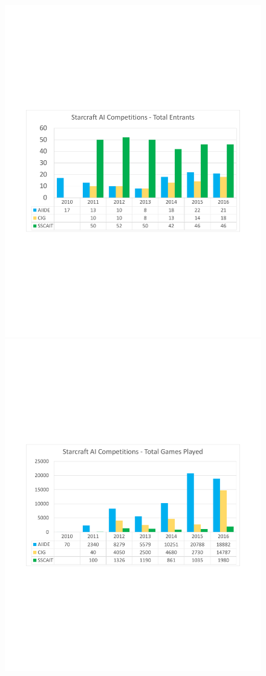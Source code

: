 \begin{figure}[t]
  \begin{center}
  \includegraphics[width=1.05\columnwidth]{fig/Entrants}
	\includegraphics[width=1.05\columnwidth]{fig/GamesPlayed}

\end{center}
\end{figure}
